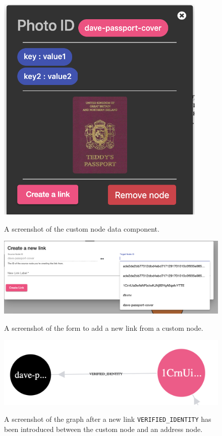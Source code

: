 \begin{figure}[h!]
  \centering
  \includegraphics[width = 10cm]{./figures/ui-screenshots/custom-node-data}\\[0.5cm] 
  \caption{A screenshot of the custom node data component.}
  \label{fig:custom-node-data}
\end{figure}


\begin{figure}[h!]
  \centering
  \includegraphics[width = 15cm]{./figures/ui-screenshots/add-link-form}\\[0.5cm] 
  \caption{A screenshot of the form to add a new link from a custom node.}
  \label{fig:add-link-form}
\end{figure}

\begin{figure}[h!]
  \centering
  \includegraphics[width = 15cm]{./figures/ui-screenshots/custom-link-graph}\\[0.5cm] 
  \caption{A screenshot of the graph after a new link \texttt{VERIFIED_IDENTITY} has been introduced between the custom node and an address node.}
  \label{fig:custom-link-graph}
\end{figure}

